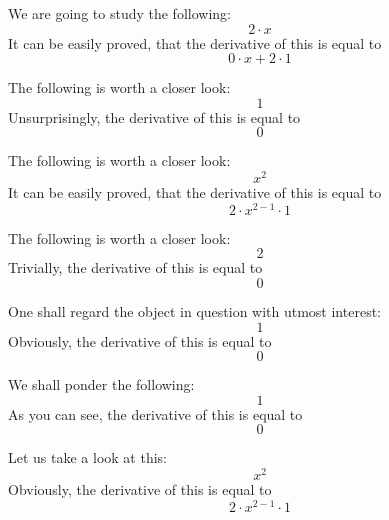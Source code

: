 \documentclass{article}
\begin{document}
We are going to study the following:
\begin{equation}
2 \cdot x 
\end{equation}
It can be easily proved, that the derivative of this is equal to
\begin{equation}
0 \cdot x + 2 \cdot 1 
\end{equation}

The following is worth a closer look:
\begin{equation}
1 
\end{equation}
Unsurprisingly, the derivative of this is equal to
\begin{equation}
0 
\end{equation}

The following is worth a closer look:
\begin{equation}
x ^{2 } 
\end{equation}
It can be easily proved, that the derivative of this is equal to
\begin{equation}
2 \cdot x ^{2 - 1 } \cdot 1 
\end{equation}

The following is worth a closer look:
\begin{equation}
2 
\end{equation}
Trivially, the derivative of this is equal to
\begin{equation}
0 
\end{equation}

One shall regard the object in question with utmost interest:
\begin{equation}
1 
\end{equation}
Obviously, the derivative of this is equal to
\begin{equation}
0 
\end{equation}

We shall ponder the following:
\begin{equation}
1 
\end{equation}
As you can see, the derivative of this is equal to
\begin{equation}
0 
\end{equation}

Let us take a look at this:
\begin{equation}
x ^{2 } 
\end{equation}
Obviously, the derivative of this is equal to
\begin{equation}
2 \cdot x ^{2 - 1 } \cdot 1 
\end{equation}
\end{document}
